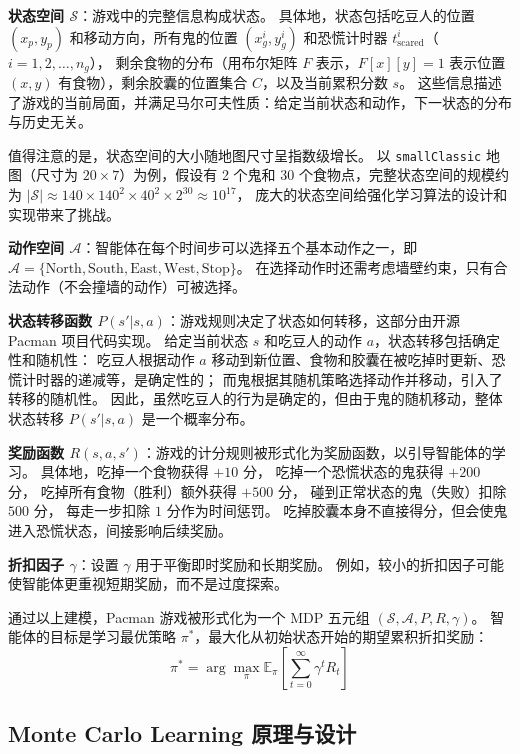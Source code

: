 \textbf{状态空间 $\mathcal{S}$}：游戏中的完整信息构成状态。
具体地，状态包括吃豆人的位置 $(x_p, y_p)$ 和移动方向，所有鬼的位置 $(x_g^i, y_g^i)$ 和恐慌计时器 $t_{\text{scared}}^i$（$i = 1, 2, \ldots, n_g$），
剩余食物的分布（用布尔矩阵 $F$ 表示，$F[x][y] = 1$ 表示位置 $(x,y)$ 有食物），剩余胶囊的位置集合 $C$，以及当前累积分数 $s$。
这些信息描述了游戏的当前局面，并满足马尔可夫性质：给定当前状态和动作，下一状态的分布与历史无关。

值得注意的是，状态空间的大小随地图尺寸呈指数级增长。
以 \texttt{smallClassic} 地图（尺寸为 $20 \times 7$）为例，假设有 2 个鬼和 30 个食物点，完整状态空间的规模约为
$|\mathcal{S}| \approx 140 \times 140^2 \times 40^2 \times 2^{30} \approx 10^{17}$，
庞大的状态空间给强化学习算法的设计和实现带来了挑战。

\textbf{动作空间 $\mathcal{A}$}：智能体在每个时间步可以选择五个基本动作之一，即
$\mathcal{A} = \{\text{North}, \text{South}, \text{East}, \text{West}, \text{Stop}\}$。
在选择动作时还需考虑墙壁约束，只有合法动作（不会撞墙的动作）可被选择。

\textbf{状态转移函数 $P(s'|s,a)$}：游戏规则决定了状态如何转移，这部分由开源 Pacman 项目代码实现。
给定当前状态 $s$ 和吃豆人的动作 $a$，状态转移包括确定性和随机性：
吃豆人根据动作 $a$ 移动到新位置、食物和胶囊在被吃掉时更新、恐慌计时器的递减等，是确定性的；
而鬼根据其随机策略选择动作并移动，引入了转移的随机性。
因此，虽然吃豆人的行为是确定的，但由于鬼的随机移动，整体状态转移 $P(s'|s,a)$ 是一个概率分布。

\textbf{奖励函数 $R(s,a,s')$}：游戏的计分规则被形式化为奖励函数，以引导智能体的学习。
具体地，吃掉一个食物获得 $+10$ 分，
吃掉一个恐慌状态的鬼获得 $+200$ 分，
吃掉所有食物（胜利）额外获得 $+500$ 分，
碰到正常状态的鬼（失败）扣除 $500$ 分，
每走一步扣除 $1$ 分作为时间惩罚。
吃掉胶囊本身不直接得分，但会使鬼进入恐慌状态，间接影响后续奖励。

\textbf{折扣因子 $\gamma$}：设置 $\gamma$ 用于平衡即时奖励和长期奖励。
例如，较小的折扣因子可能使智能体更重视短期奖励，而不是过度探索。

通过以上建模，Pacman 游戏被形式化为一个 MDP 五元组 $(\mathcal{S}, \mathcal{A}, P, R, \gamma)$。
智能体的目标是学习最优策略 $\pi^*$，最大化从初始状态开始的期望累积折扣奖励：
\begin{equation}
    \label{eq:optimal_policy}
    \pi^* = \arg\max_\pi \mathbb{E}_\pi \left[ \sum_{t=0}^\infty \gamma^t R_t \right]
\end{equation}



\subsection{Monte Carlo Learning 原理与设计}

